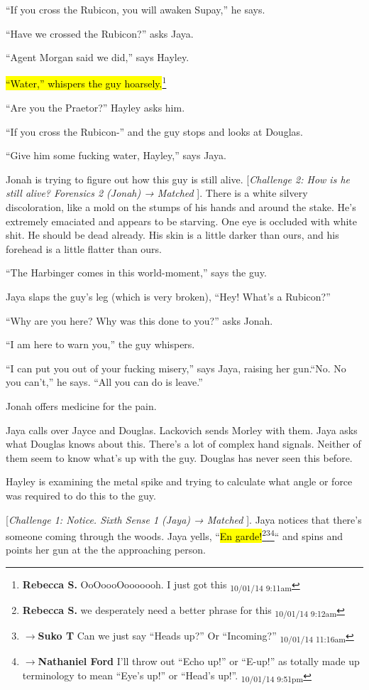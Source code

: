 ``If you cross the Rubicon, you will awaken Supay,'' he says.

``Have we crossed the Rubicon?'' asks Jaya.

``Agent Morgan said we did,'' says Hayley. 

\hl{``Water,'' whispers the guy hoarsely.}\footnote{\textbf{Rebecca S. }OoOoooOooooooh.  I just got this \textsubscript{10/01/14 9:11am}}

``Are you the Praetor?'' Hayley asks him.

``If you cross the Rubicon-'' and the guy stops and looks at Douglas.

``Give him some fucking water, Hayley,'' says Jaya.

Jonah is trying to figure out how this guy is still alive.  {[}\textit{Challenge 2:  How is he still alive?  Forensics 2 (Jonah) → Matched }{]}. There is a white silvery discoloration, like a mold on the stumps of his hands and around the stake.  He's extremely emaciated and appears to be starving.  One eye is occluded with white shit.  He should be dead already.  His skin is a little darker than ours, and his forehead is a little flatter than ours.

``The Harbinger comes in this world-moment,'' says the guy.

Jaya slaps the guy's leg (which is very broken), ``Hey!  What's a Rubicon?''

``Why are you here? Why was this done to you?'' asks Jonah.

``I am here to warn you,'' the guy whispers.

``I can put you out of your fucking misery,'' says Jaya, raising her gun.``No.  No you can't,'' he says.  ``All you can do is leave.''

Jonah offers medicine for the pain.

Jaya calls over Jayce and Douglas.  Lackovich sends Morley with them.  Jaya asks what Douglas knows about this. There's a lot of complex hand signals.  Neither of them seem to know what's up with the guy.  Douglas has never seen this before.

Hayley is examining the metal spike and trying to calculate what angle or force was required to do this to the guy.  



{[}\textit{Challenge 1: Notice.  Sixth Sense 1 (Jaya) → Matched }{]}.  Jaya notices that there's someone coming through the woods.  Jaya yells, ``\hl{En garde!}\footnote{\textbf{Rebecca S. }we desperately need a better phrase for this \textsubscript{10/01/14 9:12am}}\footnote{$\rightarrow$\textbf{Suko T }Can we just say ``Heads up?''  Or ``Incoming?'' \textsubscript{10/01/14 11:16am}}\footnote{$\rightarrow$\textbf{Nathaniel Ford }I'll throw out ``Echo up!'' or ``E-up!'' as totally made up terminology to mean ``Eye's up!'' or ``Head's up!''. \textsubscript{10/01/14 9:51pm}}`` and spins and points her gun at the the approaching person.

